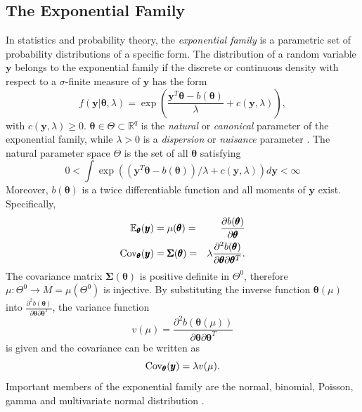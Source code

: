 \subsection{The Exponential Family}
In statistics and probability theory, the \textit{exponential family} is a parametric set of probability distributions of a specific form. The distribution of a random variable $\pmb{y}$ belongs to the exponential family if the discrete or continuous density with respect to a $\sigma$-finite measure of $\pmb{y}$ has the form
\begin{equation}
    f(\pmb{y}|\pmb{\theta}, \lambda)=\exp\left(\frac{\pmb{y}^T\pmb{\theta} - b(\pmb{\theta})}{\lambda}+c(\pmb{y},\lambda) \right),
\end{equation}
with $c(\pmb{y},\lambda)\geq 0$. %
$\pmb{\theta}\in\Theta\subset\mathbb{R}^q$ is the \textit{natural} or \textit{canonical} parameter of the exponential family, while $\lambda > 0$ is a \textit{dispersion} or \textit{nuisance} parameter \autocite[][]{holland1981exponential}. The natural parameter space $\Theta$ is the set of all $\pmb{\theta}$ satisfying
\begin{equation}
    0<\int\exp\left(\left(\pmb{y}^T\pmb{\theta} - b(\pmb{\theta})\right)/\lambda+c(\pmb{y},\lambda) \right)d\pmb{y}< \infty
\end{equation} Moreover, $b(\pmb{\theta})$ is a twice differentiable  function and all moments of $\pmb{y}$ exist. Specifically, 
\begin{alignat}{3}
    \mathbb{E}_{\pmb{\theta}}(\pmb{y}) &= \mu(\pmb{\theta}) =& \frac{\partial b(\pmb{\theta})}{\partial\pmb{\theta}} \\
    \hbox{Cov}_{\pmb{\theta}}(\pmb{y}) &= \pmb{\Sigma}(\pmb{\theta}) =& \lambda\frac{\partial^2b(\pmb{\theta})}{\partial\pmb{\theta}\partial\pmb{\theta}^T}.
\end{alignat}
The covariance matrix $\pmb{\Sigma}(\pmb{\theta})$ is positive definite in $\Theta^0$, therefore $\mu:\Theta^0\rightarrow  M = \mu\left(\Theta^0\right)$ is injective. By substituting the inverse function $\pmb{\theta}(\mu)$ into $\frac{\partial^2b(\pmb{\theta})}{\partial\pmb{\theta}\partial\pmb{\theta}^T}$, the variance function 
\begin{equation}
    v(\mu)=\frac{\partial^2b(\pmb{\theta}(\mu))}{\partial\pmb{\theta}\partial\pmb{\theta}^T}
\end{equation}
is given and the covariance can be written as
\begin{equation}
    \hbox{Cov}_{\pmb{\theta}}(\pmb{y}) = \lambda v(\mu).
\end{equation}
Important members of the exponential family are the normal, binomial, Poisson, gamma and multivariate normal distribution \autocite[][433]{fahrmeir2013multivariate}.

